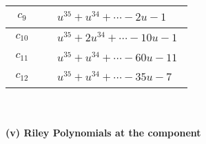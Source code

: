 \documentclass[1p]{elsarticle_modified}
\theoremstyle{definition}
\begin{document}
\begin{tabular}{m{50pt}|m{274pt}}
\hline $$\begin{aligned}c_{9}\end{aligned}$$&$\begin{aligned}
&u^{35}+u^{34}+\cdots-2 u-1
\end{aligned}$\\
\hline $$\begin{aligned}c_{10}\end{aligned}$$&$\begin{aligned}
&u^{35}+2 u^{34}+\cdots-10 u-1
\end{aligned}$\\
\hline $$\begin{aligned}c_{11}\end{aligned}$$&$\begin{aligned}
&u^{35}+u^{34}+\cdots-60 u-11
\end{aligned}$\\
\hline $$\begin{aligned}c_{12}\end{aligned}$$&$\begin{aligned}
&u^{35}+u^{34}+\cdots-35 u-7
\end{aligned}$\\
\hline
\end{tabular}\\~\\
\newpage\renewcommand{\arraystretch}{1}
\flushleft \textbf{(v) Riley Polynomials at the component}\newline \\
\end{document}
